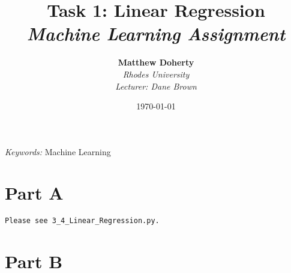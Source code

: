 \documentclass[11pt]{diazessay} %
\title{\textbf{Task 1: Linear Regression} \\ {\Large\itshape Machine Learning Assignment}} %
\author{\textbf{Matthew Doherty} \\ \textit{Rhodes University} \\ \textit{Lecturer: Dane Brown}} %
\date{\today} %
\begin{document}
\maketitle %



\renewcommand{\thesection}{\arabic{section}}
\renewcommand{\thesubsection}{\arabic{subsection}}
\renewcommand{\thesubsubsection}{\arabic{subsubsection}}
\renewcommand{\thesubsection}{\thesection.\arabic{subsection}}
\renewcommand*{\thesubsubsection}{\thesubsection.\arabic{subsubsection}}


\hspace*{3.6mm}\textit{Keywords:} Machine Learning %

\vspace{30pt} %



\section*{Part A}

\begin{lstlisting}
Please see 3_4_Linear_Regression.py.
\end{lstlisting}



\section*{Part B}
\end{document}
